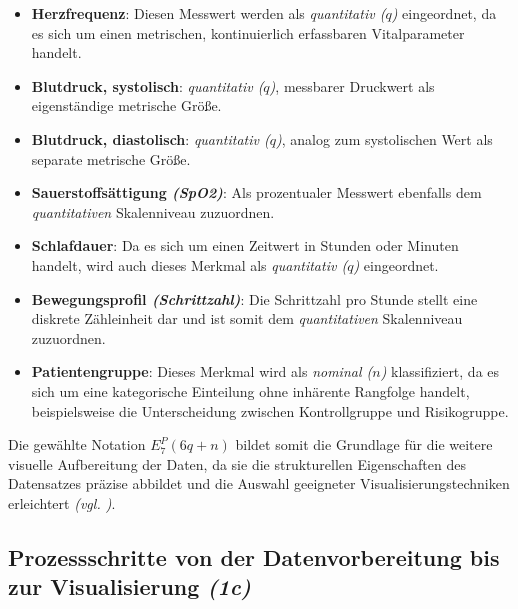 \begin{itemize}
    \item \textbf{Herzfrequenz}: Diesen Messwert werden als \textit{quantitativ (\(q\))} eingeordnet, da es sich um einen metrischen, kontinuierlich erfassbaren Vitalparameter handelt.
    
    \item \textbf{Blutdruck, systolisch}: \textit{quantitativ (\(q\))}, messbarer Druckwert als eigenständige metrische Größe.
    
    \item \textbf{Blutdruck, diastolisch}: \textit{quantitativ (\(q\))}, analog zum systolischen Wert als separate metrische Größe.
    
    \item \textbf{Sauerstoffsättigung \textit{(\acs{SpO2})}}: Als prozentualer Messwert ebenfalls dem \textit{quantitativen} Skalenniveau zuzuordnen.
    
    \item \textbf{Schlafdauer}: Da es sich um einen Zeitwert in Stunden oder Minuten handelt, wird auch dieses Merkmal als \textit{quantitativ (\(q\))} eingeordnet.
    
    \item \textbf{Bewegungsprofil \textit{(Schrittzahl)}}: Die Schrittzahl pro Stunde stellt eine diskrete Zähleinheit dar und ist somit dem \textit{quantitativen} Skalenniveau zuzuordnen.
    
    \item \textbf{Patientengruppe}: Dieses Merkmal wird als \textit{nominal (\(n\))} klassifiziert, da es sich um eine kategorische Einteilung ohne inhärente Rangfolge handelt, beispielsweise die Unterscheidung zwischen Kontrollgruppe und Risikogruppe.
\end{itemize}

Die gewählte Notation \(E_{7}^{P}(6q + n)\) bildet somit die Grundlage für die weitere visuelle Aufbereitung der Daten, da sie die strukturellen Eigenschaften des Datensatzes präzise abbildet und die Auswahl geeigneter Visualisierungstechniken erleichtert \textit{(\acs{vgl.} \cite[61]{1})}.


\subsection{Prozessschritte von der Datenvorbereitung bis zur Visualisierung \textit{(1c)}}
\label{sec:1c}

